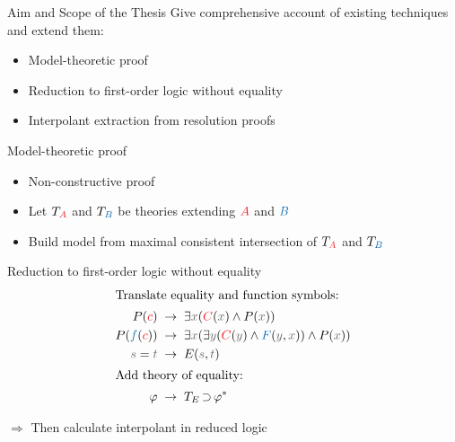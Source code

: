 \documentclass[final,hyperref={pdfpagelabels=true}]{beamer}
\newcommand{\colOne}[1]{ {\color{TuInfRed}#1}}
\newcommand{\colTwo}[1]{ {\color{TuWienBlue}#1}}
\newcommand{\colA}[1]{ \colOne{#1} }
\newcommand{\colB}[1]{ \colTwo{#1} }
\newcommand{\gray}[1]{ {\color{darkgray}#1}}
\DeclareMathOperator{\limpl}{\supset}
\begin{document}
\begin{frame}
\begin{columns}[t]
\begin{column}{\mycolwidth}
			\begin{block}{Aim and Scope of the Thesis}
				Give comprehensive account of existing techniques and extend them:
				\begin{itemize}
					\item Model-theoretic proof 
					\item Reduction to first-order logic without equality
					\item Interpolant extraction from resolution proofs
				\end{itemize}
			\end{block}

			\begin{block}{Model-theoretic proof}
				\vspace*{-0.8em}

				\begin{itemize}
					\item Non-constructive proof
					\item Let $T_\colA{A}$ and $T_\colB{B}$ be theories extending $\colA A$ and $\colB B$
					\item Build model from maximal consistent intersection of $T_\colA{A}$ and $T_\colB{B}$
				\end{itemize}

			\end{block}


			\begin{block}{Reduction to first-order logic without equality \cite{Craig57linear}} 
				\vspace*{-0.8em}
				\newcommand{\transformsep}{\;\to\;}
				\begin{align*}
					\intertext{Translate equality and function symbols:}
					P(\colA c) & \transformsep \exists \gray x (\colA C(\gray x) \land P(\gray x)) \\
					P(\colB f( \colA c)) & \transformsep  \exists \gray x (  \exists \gray y( \colA C(\gray y) \land \colB F(\gray y, \gray x)) \land P(\gray x)) \\
					\gray s = \gray t & \transformsep E(\gray s, \gray t) \\
					\intertext{Add theory of equality:} 
					\varphi & \transformsep T_E \limpl \varphi^*
				\end{align*}

				$\Rightarrow$ Then calculate interpolant in reduced logic

			\end{block}


\end{column}
\end{columns}
\end{frame}
\end{document}
